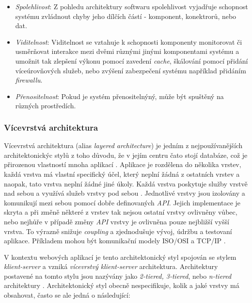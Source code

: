 \begin{itemize}
  \item{\textit{Spolehlivost}}: Z pohledu architektury softwaru spolehlivost vyjadřuje schopnost systému zvládnout chyby jeho dílčích částí - komponent, konektrorů, nebo dat. 
  \item{\textit{Viditelnost}}: Viditelnost se vztahuje k schopnosti komponenty monitorovat či usměrňovat interakce mezi dvěmi různými jinými komponentami systému a umožnit tak zlepšení výkonu pomocí zavedení \textit{cache}, škálování pomocí přidání víceúrovňových služeb, nebo zvýšení zabezpečení systému například přidáním \textit{firewallu}.
  \item{\textit{Přenositelnost}}: Pokud je systém přenositelnýný, může být spuštěný na různých prostředích. 
\end{itemize}



\subsubsection{Vícevrstvá architektura}
\label{sec:n-tier}
Vícevrstvá architektura (alias \textit{layered architecture}) je jedním z nejpoužívanějších architektonickýc stylů z toho důvodu, že v jejím centru čato stojí databáze, což je přirozenou vlastností mnoha aplikací \cite{Richards15}. Aplikace je rozdělena do několika vrstev, každá vrstva má vlastní specifický účel, který neplní žádná z ostatních vrstev a naopak, tato vrstva neplní žádné jiné úkoly. Každá vrstva poskytuje služby vrstvě nad sebou a využívá služeb vrstvy pod sebou \cite{Garlan94}. Jednotlivé vrstvy jsou izolovány a komunikují mezi sebou pomocí dobře definovaných \textit{API}. Jejich implementace je skryta a při změně některé z vrstev tak nejsou ostatní vrstvy ovlivněny vůbec, nebo nejhůře v případě změny \textit{API} vrstvy je ovlivněna pouze nejbližší vyšší vrstva. To výrazně snižuje \textit{coupling} a zjednodušuje vývoj, údržbu a testovaní aplikace. Příkladem mohou být komunikační modely ISO/OSI a TCP/IP \cite{Zimmerman80}. 

V kontextu webových aplikací je tento architektonický styl spojován se stylem \textit{klient-server} a vzniká \textit{vícevrstvý klient-server} architektura. Architektury postavené na tomto stylu jsou nazývány jako \textit{2-tiered, 3-tiered}, nebo \textit{n-tiered} architektury \cite{Umar97}. Architektonický styl obecně nespecifikuje, kolik a jaké vrstvy má obsahovat, často se ale jedná o následující: 

